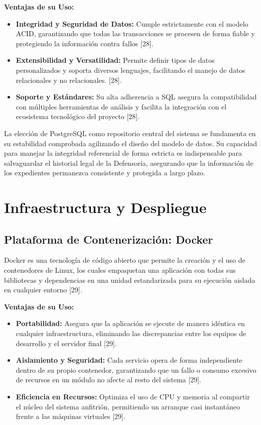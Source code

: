 \textbf{Ventajas de su Uso:}
\begin{itemize}
    \item \textbf{Integridad y Seguridad de Datos:} Cumple estrictamente con el modelo ACID, garantizando que todas las transacciones se procesen de forma fiable y protegiendo la información contra fallos [28].
    \item \textbf{Extensibilidad y Versatilidad:} Permite definir tipos de datos personalizados y soporta diversos lenguajes, facilitando el manejo de datos relacionales y no relacionales. [28].
    \item \textbf{Soporte y Estándares:} Su alta adherencia a SQL asegura la compatibilidad con múltiples herramientas de análisis y facilita la integración con el ecosistema tecnológico del proyecto [28].
\end{itemize}

La elección de PostgreSQL como repositorio central del sistema se fundamenta en su estabilidad comprobada agilizando el diseño del modelo de datos. Su capacidad para manejar la integridad referencial de forma estricta es indispensable para salvaguardar el historial legal de la Defensoría, asegurando que la información de los expedientes permanezca consistente y protegida a largo plazo.

\section{Infraestructura y Despliegue}
\subsection{Plataforma de Contenerización: Docker}
Docker es una tecnología de código abierto que permite la creación y el uso de contenedores de Linux, los cuales empaquetan una aplicación con todas sus bibliotecas y dependencias en una unidad estandarizada para su ejecución aislada en cualquier entorno [29].

\textbf{Ventajas de su Uso:}
\begin{itemize}
    \item \textbf{Portabilidad:} Asegura que la aplicación se ejecute de manera idéntica en cualquier infraestructura, eliminando las discrepancias entre los equipos de desarrollo y el servidor final [29].
    \item \textbf{Aislamiento y Seguridad:} Cada servicio opera de forma independiente dentro de su propio contenedor, garantizando que un fallo o consumo excesivo de recursos en un módulo no afecte al resto del sistema [29].
    \item \textbf{Eficiencia en Recursos:} Optimiza el uso de CPU y memoria al compartir el núcleo del sistema anfitrión, permitiendo un arranque casi instantáneo frente a las máquinas virtuales [29].
\end{itemize}

